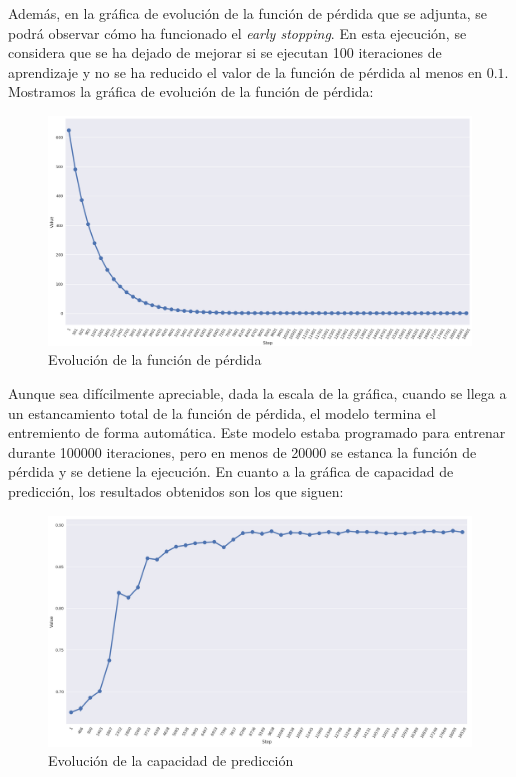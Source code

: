 \documentclass[11pt]{article}
\theoremstyle{plain}
\theoremstyle{definition}
\begin{document}
Además, en la gráfica de evolución de la función de pérdida que se
adjunta, se podrá observar cómo ha funcionado el \textit{early
  stopping}.  En esta ejecución, se considera que se ha dejado de
mejorar si se ejecutan 100 iteraciones de aprendizaje y no se ha
reducido el valor de la función de pérdida al menos en
$0.1$. Mostramos la gráfica de evolución de la función de pérdida:

\begin{figure}[H]
  \centering \includegraphics[width=.95\textwidth]{imgs/loss_dropout}
  \caption{Evolución de la función de pérdida}
\end{figure}

Aunque sea difícilmente apreciable, dada la escala de la gráfica,
cuando se llega a un estancamiento total de la función de pérdida, el
modelo termina el entremiento de forma automática. Este modelo estaba
programado para entrenar durante 100000 iteraciones, pero en menos de
20000 se estanca la función de pérdida y se detiene la ejecución. En
cuanto a la gráfica de capacidad de predicción, los resultados
obtenidos son los que siguen:

\begin{figure}[H]
  \centering
  \includegraphics[width=.95\textwidth]{imgs/accuracy_dropout}
  \caption{Evolución de la capacidad de predicción}
\end{figure}
\end{document}
